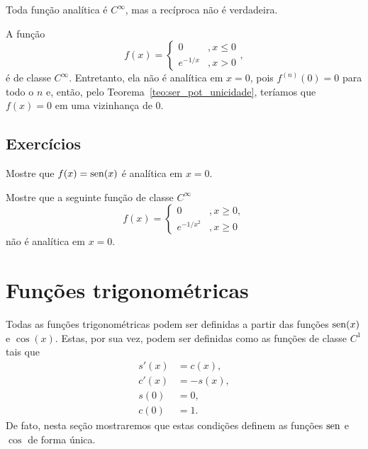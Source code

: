 \begin{obs}
  Toda função analítica é $C^\infty$, mas a recíproca não é verdadeira.
\end{obs}

\begin{ex}
  A função
  \begin{equation}
    f(x) = \left\{
      \begin{array}{ll}
        0 &, x\leq 0\\
        e^{-1/x} &, x>0
      \end{array}
\right.,
  \end{equation}
é de classe $C^\infty$. Entretanto, ela não é analítica em $x=0$, pois $f^{(n)}(0)=0$ para todo o $n$ e, então, pelo Teorema~\ref{teo:ser_pot_unicidade}, teríamos que $f(x)= 0$ em uma vizinhança de $0$.
\end{ex}

\subsection*{Exercícios}

\begin{exer}
  Mostre que $f(x)=\operatorname{sen}(x)$ é analítica em $x=0$.
\end{exer}

\begin{exer}
  Mostre que a seguinte função de classe $C^\infty$
  \begin{equation}
    f(x) = \left\{
      \begin{array}{ll}
        0 &,x\geq 0,\\
        e^{-1/x^2} &,x\geq 0
      \end{array}
\right.
  \end{equation}
não é analítica em $x=0$.
\end{exer}

\section{Funções trigonométricas}\label{cap_ssfuncoes_sec_fun_trigo}

Todas as funções trigonométricas podem ser definidas a partir das funções $\operatorname{sen}(x)$ e $\cos(x)$. Estas, por sua vez, podem ser definidas como as funções de classe $C^1$ tais que
\begin{align}
  s'(x) &= c(x),\label{eq:s_deriv}\\
  c'(x) &= -s(x),\label{eq:c_deriv}\\
  s(0) &= 0,\label{eq:s_0}\\
  c(0) &= 1.\label{eq:c_1}
\end{align}
De fato, nesta seção mostraremos que estas condições definem as funções $\operatorname{sen}$ e $\cos$ de forma única.

